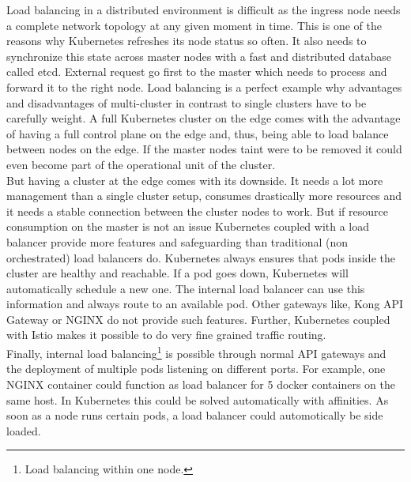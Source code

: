 Load balancing in a distributed environment is difficult as the ingress node needs a complete network topology at any given moment in time. This is one of the reasons why Kubernetes refreshes its node status so often. It also needs to synchronize this state across master nodes with a fast and distributed database called etcd. External request go first to the master which needs to process and forward it to the right node. Load balancing is a perfect example why advantages and disadvantages of multi-cluster in contrast to single clusters have to be carefully weight. A full Kubernetes cluster on the edge comes with the advantage of having a full control plane on the edge and, thus, being able to load balance between nodes on the edge. If the master nodes taint were to be removed it could even become part of the operational unit of the cluster.\\
But having a cluster at the edge comes with its downside. It needs a lot more management than a single cluster setup, consumes drastically more resources  and it needs a stable connection between the cluster nodes to work. But if resource consumption on the master is not an issue Kubernetes coupled with a load balancer provide more features and safeguarding than traditional (non orchestrated) load balancers do. Kubernetes always ensures that pods inside the cluster are healthy and reachable. If a pod goes down, Kubernetes will automatically schedule a new one. The internal load balancer can use this information and always route to an available pod. Other gateways like, Kong API Gateway or NGINX do not provide such features. Further, Kubernetes coupled with Istio makes it possible to do very fine grained traffic routing.\\
Finally, internal load balancing\footnote{Load balancing within one node.} is possible through normal API gateways and the deployment of multiple pods listening on different ports. For example, one NGINX container could function as load balancer for 5 docker containers on the same host. In Kubernetes this could be solved automatically with affinities. As soon as a node runs certain pods, a load balancer could automotically be side loaded.\\[5mm]